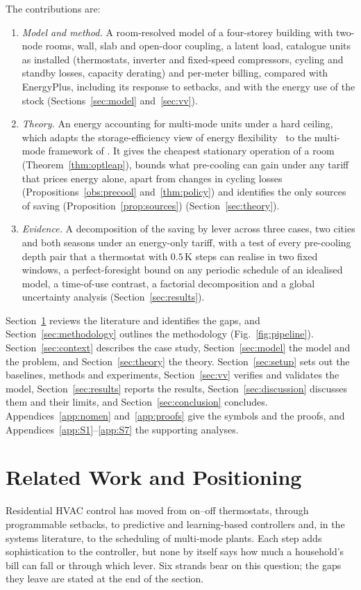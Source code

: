 \documentclass[10pt,a4paper,twocolumn]{article}
\theoremstyle{definition}
\begin{document}
The contributions are:
\begin{enumerate}[label=(\arabic*),leftmargin=1.6em,itemsep=2pt,topsep=2pt]
\item \emph{Model and method.} A room-resolved model of a four-storey building with two-node rooms, wall, slab and open-door coupling, a latent load, catalogue units as installed (thermostats, inverter and fixed-speed compressors, cycling and standby losses, capacity derating) and per-meter billing, compared with EnergyPlus, including its response to setbacks, and with the energy use of the stock (Sections~\ref{sec:model} and~\ref{sec:vv}).
\item \emph{Theory.} An energy accounting for multi-mode units under a hard ceiling, which adapts the storage-efficiency view of energy flexibility~\citep{ledreau2016flex,reynders2018flex} to the multi-mode framework of \citet{mousa2016optimal,mousa2017optimal}. It gives the cheapest stationary operation of a room (Theorem~\ref{thm:optleap}), bounds what pre-cooling can gain under any tariff that prices energy alone, apart from changes in cycling losses (Propositions~\ref{obs:precool} and~\ref{thm:policy}) and identifies the only sources of saving (Proposition~\ref{prop:sources}) (Section~\ref{sec:theory}).
\item \emph{Evidence.} A decomposition of the saving by lever across three cases, two cities and both seasons under an energy-only tariff, with a test of every pre-cooling depth pair that a thermostat with $0.5\,$K steps can realise in two fixed windows, a perfect-foresight bound on any periodic schedule of an idealised model, a time-of-use contrast, a factorial decomposition and a global uncertainty analysis (Section~\ref{sec:results}).
\end{enumerate}
Section~\ref{sec:related} reviews the literature and identifies the gaps, and Section~\ref{sec:methodology} outlines the methodology (Fig.~\ref{fig:pipeline}). Section~\ref{sec:context} describes the case study, Section~\ref{sec:model} the model and the problem, and Section~\ref{sec:theory} the theory. Section~\ref{sec:setup} sets out the baselines, methods and experiments, Section~\ref{sec:vv} verifies and validates the model, Section~\ref{sec:results} reports the results, Section~\ref{sec:discussion} discusses them and their limits, and Section~\ref{sec:conclusion} concludes. Appendices~\ref{app:nomen} and~\ref{app:proofs} give the symbols and the proofs, and Appendices~\ref{app:S1}--\ref{app:S7} the supporting analyses.
\section{Related Work and Positioning}\label{sec:related}
Residential HVAC control has moved from on--off thermostats, through programmable setbacks, to predictive and learning-based controllers and, in the systems literature, to the scheduling of multi-mode plants. Each step adds sophistication to the controller, but none by itself says how much a household's bill can fall or through which lever. Six strands bear on this question; the gaps they leave are stated at the end of the section.
\end{document}
